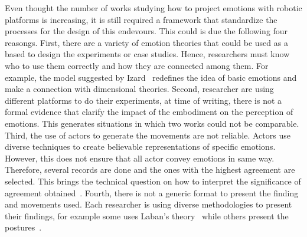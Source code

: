 Even thought the number of works studying how to project emotions with robotic platforms is increasing, it is still required a framework that standardize the processes for the design of this endevours. This could is due the following four reasongs. First, there are a variety of emotion theories that could be used as a based to design the experiments or case studies. Hence, researchers must know who to use them correctly and how they are connected among them. For example, the model suggested by Izard~\cite{Izard2007} redefines the idea of basic emotions and make a connection with dimensional theories. Second, researcher are using different platforms to do their experiments, at time of writing, there is not a formal evidence that clarify the impact of the embodiment on the perception of emotions. This generates situations in which two works could not be comparable. Third, the use of actors to generate the movements are not reliable. Actors use diverse techniques to create believable representations of specific emotions. However, this does not ensure that all actor convey emotions in same way. Therefore, several records are done and the ones with the highest agreement are selected. This brings the technical question on how to interpret the significance of agreement obtained~\cite{Russell2003}. Fourth, there is not a generic format to present the finding and movements used. Each researcher is using diverse methodologies to present their findings, for example some uses Laban's theory~\cite{Sharma2013} while others present the postures~\cite{NAO2013}.  